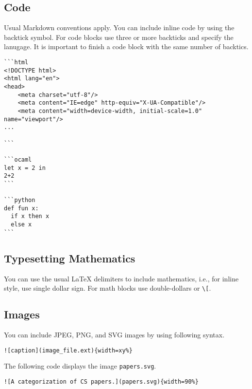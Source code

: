 \subsection{Code}
\label{sec:dc::md::code}

Usual Markdown conventions apply.  You can include inline code by using the backtick symbol. For code blocks use three or more backticks and specify the lanugage. It is important to finish a code block with the same number of backtics.

\begin{example}
\begin{lstlisting}
```html
<!DOCTYPE html>
<html lang="en">
<head>
    <meta charset="utf-8"/>
    <meta content="IE=edge" http-equiv="X-UA-Compatible"/>
    <meta content="width=device-width, initial-scale=1.0" name="viewport"/>
...

```

```ocaml
let x = 2 in
2+2
```

```python
def fun x:
  if x then x
  else x
```
\end{lstlisting}
\end{example} 

\subsection{Typesetting Mathematics}

You can use the usual LaTeX delimiters to include mathematics, i.e., for inline style, use single dollar sign.
%
For math blocks use double-dollars or \lstinline`\[`.

\subsection{Images}

\begin{flex}
\begin{gram}
You can include JPEG, PNG, and SVG images by using following syntax.
\begin{lstlisting}
![caption](image_file.ext){width=xy%}
\end{lstlisting}
\end{gram}

\begin{example}
The following code displays the image \lstinline`papers.svg`.
\begin{lstlisting}
![A categorization of CS papers.](papers.svg){width=90%}
\end{lstlisting}
\end{example}
\end{flex}

